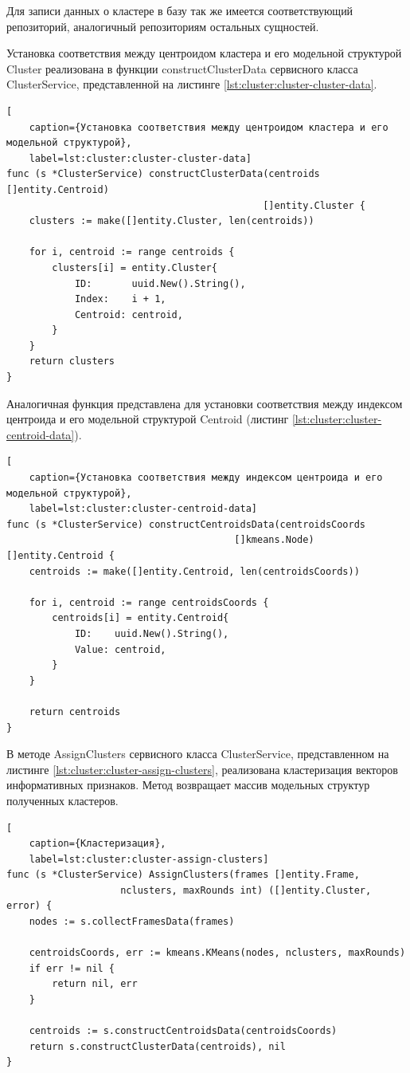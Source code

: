 Для записи данных о кластере в базу так же имеется соответствующий репозиторий, аналогичный репозиториям остальных сущностей. 

Установка соответствия между центроидом кластера и его модельной структурой Cluster реализована в функции constructClusterData сервисного класса ClusterService, представленной на листинге \ref{lst:cluster:cluster-cluster-data}.
\begin{lstlisting}[
	caption={Установка соответствия между центроидом кластера и его модельной структурой},
	label=lst:cluster:cluster-cluster-data]
func (s *ClusterService) constructClusterData(centroids []entity.Centroid) 
											 []entity.Cluster {
    clusters := make([]entity.Cluster, len(centroids))
    
    for i, centroid := range centroids {
        clusters[i] = entity.Cluster{
            ID:       uuid.New().String(),
            Index:    i + 1,
            Centroid: centroid,
        }
    }
    return clusters
}
\end{lstlisting}
Аналогичная функция представлена для установки соответствия между индексом центроида и его модельной структурой Centroid (листинг \ref{lst:cluster:cluster-centroid-data}).
\begin{lstlisting}[
	caption={Установка соответствия между индексом центроида и его модельной структурой},
	label=lst:cluster:cluster-centroid-data]
func (s *ClusterService) constructCentroidsData(centroidsCoords
										[]kmeans.Node) []entity.Centroid {
    centroids := make([]entity.Centroid, len(centroidsCoords))
    
    for i, centroid := range centroidsCoords {
        centroids[i] = entity.Centroid{
            ID:    uuid.New().String(),
            Value: centroid,
        }
    }

    return centroids
}
\end{lstlisting}
В методе AssignClusters сервисного класса ClusterService, представленном на листинге \ref{lst:cluster:cluster-assign-clusters}, реализована кластеризация векторов информативных признаков. Метод возвращает массив модельных структур полученных кластеров.
\begin{lstlisting}[
	caption={Кластеризация},
	label=lst:cluster:cluster-assign-clusters]
func (s *ClusterService) AssignClusters(frames []entity.Frame, 
					nclusters, maxRounds int) ([]entity.Cluster, error) {
	nodes := s.collectFramesData(frames)
	
	centroidsCoords, err := kmeans.KMeans(nodes, nclusters, maxRounds)
	if err != nil {
		return nil, err
	}
	
	centroids := s.constructCentroidsData(centroidsCoords)
	return s.constructClusterData(centroids), nil
}
\end{lstlisting}

